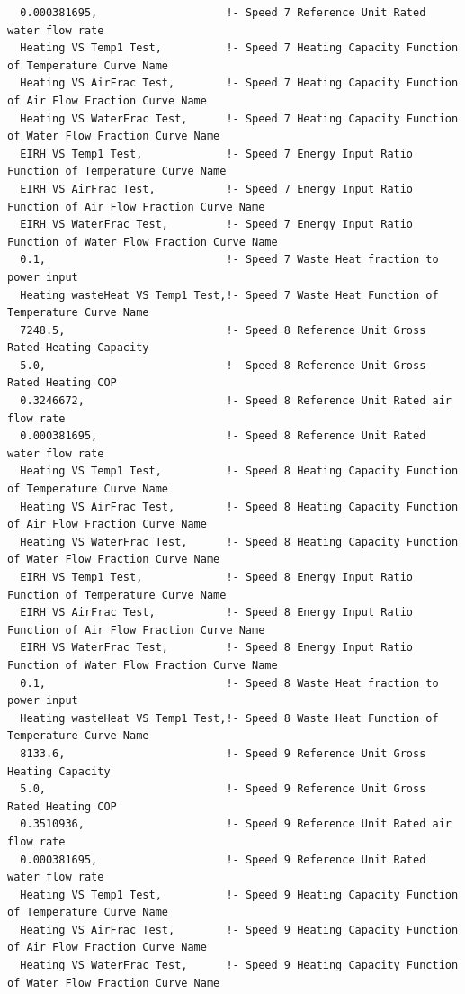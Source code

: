 \begin{lstlisting}
  0.000381695,                    !- Speed 7 Reference Unit Rated water flow rate
  Heating VS Temp1 Test,          !- Speed 7 Heating Capacity Function of Temperature Curve Name
  Heating VS AirFrac Test,        !- Speed 7 Heating Capacity Function of Air Flow Fraction Curve Name
  Heating VS WaterFrac Test,      !- Speed 7 Heating Capacity Function of Water Flow Fraction Curve Name
  EIRH VS Temp1 Test,             !- Speed 7 Energy Input Ratio Function of Temperature Curve Name
  EIRH VS AirFrac Test,           !- Speed 7 Energy Input Ratio Function of Air Flow Fraction Curve Name
  EIRH VS WaterFrac Test,         !- Speed 7 Energy Input Ratio Function of Water Flow Fraction Curve Name
  0.1,                            !- Speed 7 Waste Heat fraction to power input
  Heating wasteHeat VS Temp1 Test,!- Speed 7 Waste Heat Function of Temperature Curve Name
  7248.5,                         !- Speed 8 Reference Unit Gross Rated Heating Capacity
  5.0,                            !- Speed 8 Reference Unit Gross Rated Heating COP
  0.3246672,                      !- Speed 8 Reference Unit Rated air flow rate
  0.000381695,                    !- Speed 8 Reference Unit Rated water flow rate
  Heating VS Temp1 Test,          !- Speed 8 Heating Capacity Function of Temperature Curve Name
  Heating VS AirFrac Test,        !- Speed 8 Heating Capacity Function of Air Flow Fraction Curve Name
  Heating VS WaterFrac Test,      !- Speed 8 Heating Capacity Function of Water Flow Fraction Curve Name
  EIRH VS Temp1 Test,             !- Speed 8 Energy Input Ratio Function of Temperature Curve Name
  EIRH VS AirFrac Test,           !- Speed 8 Energy Input Ratio Function of Air Flow Fraction Curve Name
  EIRH VS WaterFrac Test,         !- Speed 8 Energy Input Ratio Function of Water Flow Fraction Curve Name
  0.1,                            !- Speed 8 Waste Heat fraction to power input
  Heating wasteHeat VS Temp1 Test,!- Speed 8 Waste Heat Function of Temperature Curve Name
  8133.6,                         !- Speed 9 Reference Unit Gross Heating Capacity
  5.0,                            !- Speed 9 Reference Unit Gross Rated Heating COP
  0.3510936,                      !- Speed 9 Reference Unit Rated air flow rate
  0.000381695,                    !- Speed 9 Reference Unit Rated water flow rate
  Heating VS Temp1 Test,          !- Speed 9 Heating Capacity Function of Temperature Curve Name
  Heating VS AirFrac Test,        !- Speed 9 Heating Capacity Function of Air Flow Fraction Curve Name
  Heating VS WaterFrac Test,      !- Speed 9 Heating Capacity Function of Water Flow Fraction Curve Name

\end{lstlisting}
